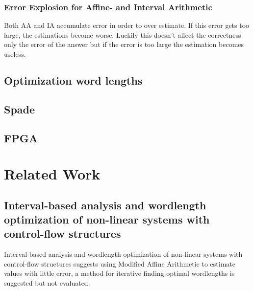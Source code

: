 \documentclass[msc,lith,english]{liuthesis}
\begin{document}
\subsection{Error Explosion for Affine- and Interval Arithmetic }

Both AA and IA accumulate error in order to over estimate. If this error gets too large, the estimations become worse. Luckily this doesn't affect the correctness only the error of the answer but if the error is too large the estimation becomes useless.



\section{Optimization word lengths}

\section{Spade}

\section{FPGA}

\chapter{Related Work}

\section{Interval-based analysis and wordlength optimization of non-linear systems with control-flow structures}
Interval-based analysis and wordlength optimization of non-linear systems with control-flow structures suggests using Modified Affine Arithmetic to estimate values with little error, a method for iterative finding optimal wordlengths is suggested but not evaluated.

\cite{src:WlOpNLSystems}
\end{document}
